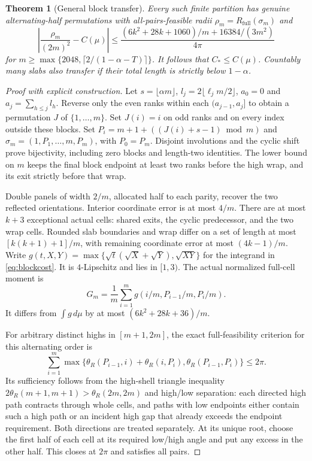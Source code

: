 \documentclass[11pt,letterpaper]{article}
\newtheorem{theorem}{Theorem}
\theoremstyle{definition}\newtheorem{definition}[theorem]{Definition}
\theoremstyle{remark}\newtheorem{remark}[theorem]{Remark}
\newcommand{\full}{R_{\mathrm{full}}}
\newcommand{\CC}{C_\ast}
\begin{document}
\begin{theorem}[General block transfer]\label{thm:blocks}
Every such finite partition has genuine alternating-half permutations with
all-pairs-feasible radii $\rho_m=\full(\sigma_m)$ and
\[
 \left|\frac{\rho_m}{(2m)^2}-C(\mu)\right|
 \le\frac{(6k^2+28k+1060)/m+16384/(3m^2)}{4\pi}
\]
for $m\ge\max\{2048,\lceil2/(1-\alpha-T)\rceil\}$.
It follows that $\CC\le C(\mu)$. Countably many slabs also transfer
if their total length is strictly below $1-\alpha$.
\end{theorem}
\begin{proof}[Proof with explicit construction]
Let $s=\lfloor\alpha m\rfloor$, $l_j=2\lfloor\ell_jm/2\rfloor$,
$a_0=0$ and $a_j=\sum_{h\le j}l_h$. Reverse only the even ranks within
each $(a_{j-1},a_j]$ to obtain a permutation $J$ of $\{1,\ldots,m\}$.
Set $J(i)=i$ on odd ranks and on every index outside these blocks.
Set $P_i=m+1+((J(i)+s-1)\bmod m)$ and
$\sigma_m=(1,P_1,\ldots,m,P_m)$, with $P_0=P_m$.
Disjoint involutions and the cyclic shift prove bijectivity, including
zero blocks and length-two identities. The lower bound on $m$ keeps the final
block endpoint at least two ranks before the high wrap, and its exit
strictly before that wrap.

Double panels of width $2/m$, allocated half to each parity, recover
the two reflected orientations. Interior coordinate error is at most
$4/m$. There are at most $k+3$ exceptional actual cells: shared exits,
the cyclic predecessor, and the two wrap cells. Rounded slab boundaries
and wrap differ on a set of length at most $[k(k+1)+1]/m$, with remaining
coordinate error at most $(4k-1)/m$. Write
$g(t,X,Y)=\max\{\sqrt t(\sqrt X+\sqrt Y),\sqrt{XY}\}$ for the integrand
in \eqref{eq:blockcost}. It is $4$-Lipschitz and lies in $[1,3)$.
The actual normalized full-cell moment is
\[
 G_m=\frac1m\sum_{i=1}^m g(i/m,P_{i-1}/m,P_i/m).
\]
It differs from
$\int g\,d\mu$ by at most $(6k^2+28k+36)/m$.

For arbitrary distinct highs in $[m+1,2m]$, the exact full-feasibility
criterion for this alternating order is
\[
 \sum_{i=1}^m\max\{\theta_R(P_{i-1},i)+\theta_R(i,P_i),
                         \theta_R(P_{i-1},P_i)\}\le2\pi.
\]
Its sufficiency follows from the high-shell triangle inequality
$2\theta_R(m+1,m+1)>\theta_R(2m,2m)$ and high/low separation:
each directed high path contracts through whole cells, and paths with
low endpoints either contain such a high path or an incident high gap
that already exceeds the endpoint requirement. Both directions are
treated separately. At its unique root, choose the first half of each
cell at its required low/high angle and put any excess in the other half.
This closes at $2\pi$ and satisfies all pairs.


\end{proof}
\end{document}
